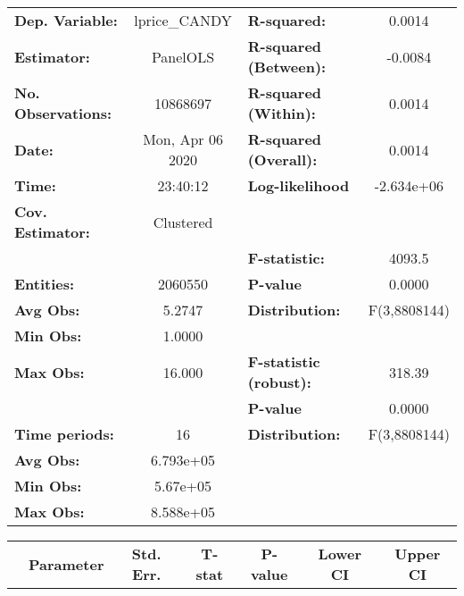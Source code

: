 \documentclass{report}
\begin{document}
\begin{center}
\begin{tabular}{lclc}
\toprule
\textbf{Dep. Variable:}    &   lprice\_CANDY    & \textbf{  R-squared:         }   &      0.0014      \\
\textbf{Estimator:}        &      PanelOLS      & \textbf{  R-squared (Between):}  &     -0.0084      \\
\textbf{No. Observations:} &      10868697      & \textbf{  R-squared (Within):}   &      0.0014      \\
\textbf{Date:}             &  Mon, Apr 06 2020  & \textbf{  R-squared (Overall):}  &      0.0014      \\
\textbf{Time:}             &      23:40:12      & \textbf{  Log-likelihood     }   &    -2.634e+06    \\
\textbf{Cov. Estimator:}   &     Clustered      & \textbf{                     }   &                  \\
\textbf{}                  &                    & \textbf{  F-statistic:       }   &      4093.5      \\
\textbf{Entities:}         &      2060550       & \textbf{  P-value            }   &      0.0000      \\
\textbf{Avg Obs:}          &       5.2747       & \textbf{  Distribution:      }   &   F(3,8808144)   \\
\textbf{Min Obs:}          &       1.0000       & \textbf{                     }   &                  \\
\textbf{Max Obs:}          &       16.000       & \textbf{  F-statistic (robust):} &      318.39      \\
\textbf{}                  &                    & \textbf{  P-value            }   &      0.0000      \\
\textbf{Time periods:}     &         16         & \textbf{  Distribution:      }   &   F(3,8808144)   \\
\textbf{Avg Obs:}          &     6.793e+05      & \textbf{                     }   &                  \\
\textbf{Min Obs:}          &      5.67e+05      & \textbf{                     }   &                  \\
\textbf{Max Obs:}          &     8.588e+05      & \textbf{                     }   &                  \\
\bottomrule
\end{tabular}
\begin{tabular}{lcccccc}
                           & \textbf{Parameter} & \textbf{Std. Err.} & \textbf{T-stat} & \textbf{P-value} & \textbf{Lower CI} & \textbf{Upper CI}  \\

\end{tabular}
\end{center}
\end{document}
